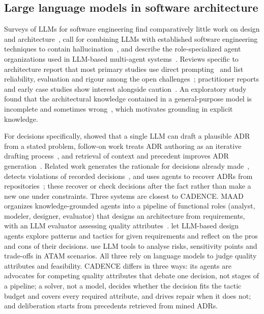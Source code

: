 \documentclass[preprint,12pt,authoryear]{elsarticle}
\renewcommand{\_}{\textunderscore\allowbreak{}}
\begin{document}
\subsection{Large language models in software architecture}

Surveys of LLMs for software engineering find comparatively little work on design and architecture~\citep{hou2024}, call for combining LLMs with established software engineering techniques to contain hallucination~\citep{fan2023}, and describe the role-specialized agent organizations used in LLM-based multi-agent systems~\citep{he2025,liu2026agents}. Reviews specific to architecture report that most primary studies use direct prompting~\citep{schmid2025} and list reliability, evaluation and rigour among the open challenges~\citep{esposito2026}; practitioner reports and early case studies show interest alongside caution~\citep{jahic2024,ahmad2023}. An exploratory study found that the architectural knowledge contained in a general-purpose model is incomplete and sometimes wrong~\citep{soliman2025}, which motivates grounding in explicit knowledge.

For decisions specifically, \citet{dhar2024llm} showed that a single LLM can draft a plausible ADR from a stated problem, follow-on work treats ADR authoring as an iterative drafting process~\citep{dhar2025drafting}, and retrieval of context and precedent improves ADR generation~\citep{contextmatters2026,contextmatters-zenodo}. Related work generates the rationale for decisions already made~\citep{zhou2025rationale}, detects violations of recorded decisions~\citep{su2026violations}, and uses agents to recover ADRs from repositories~\citep{dhar2026agenticakm}; these recover or check decisions after the fact rather than make a new one under constraints. Three systems are closest to CADENCE. MAAD organizes knowledge-grounded agents into a pipeline of functional roles (analyst, modeler, designer, evaluator) that designs an architecture from requirements, with an LLM evaluator assessing quality attributes~\citep{zhang2025maad,maad2025}. \citet{diazpace2025} let LLM-based design agents explore patterns and tactics for given requirements and reflect on the pros and cons of their decisions. \citet{capilla2025atam,capilla2026atam} use LLM tools to analyse risks, sensitivity points and trade-offs in ATAM scenarios. All three rely on language models to judge quality attributes and feasibility. CADENCE differs in three ways: its agents are advocates for competing quality attributes that debate one decision, not stages of a pipeline; a solver, not a model, decides whether the decision fits the tactic budget and covers every required attribute, and drives repair when it does not; and deliberation starts from precedents retrieved from mined ADRs.
\end{document}
